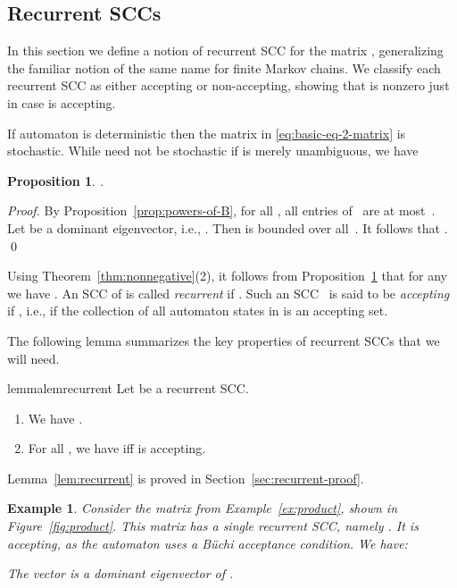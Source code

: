 \documentclass{elsarticle}
\newtheorem{proposition}[definition]{Proposition}
\newtheorem{example}[definition]{Example}
\begin{document}
\subsection{Recurrent SCCs}
\label{sub:recurrent}
In this section we define a notion of recurrent SCC for the matrix
, generalizing the familiar notion of the same name for finite
Markov chains.  We classify each recurrent SCC  as either accepting
or non-accepting, showing that  is nonzero just in case
 is accepting.

If automaton  is deterministic then the matrix  in
\eqref{eq:basic-eq-2-matrix} is stochastic.  While  need not be
stochastic if  is merely unambiguous, we have
\begin{proposition} \label{prop:spectral-radius-le-1}
  .
\end{proposition}
\begin{proof}
By Proposition~\ref{prop:powers-of-B}, for all , all entries of~ are at most~.
Let  be a dominant eigenvector, i.e., .
Then  is bounded over all~.
It follows that .
\qed
\end{proof}

Using Theorem~\ref{thm:nonnegative}(2), it follows from
Proposition~\ref{prop:spectral-radius-le-1} that for any
 we have .  An SCC
 of  is called \emph{recurrent} if
.  Such an SCC~ is said to be \emph{accepting} if
, i.e., if the collection
of all automaton states in  is an accepting set.

The following lemma summarizes the key properties of recurrent SCCs
that we will need.
\begin{restatable}{lemma}{lemrecurrent}\label{lem:recurrent}\label{LEM:RECURRENT}
  Let  be a recurrent SCC.
\begin{enumerate}
\item We have .
\item For all , we have  iff  is accepting.
\end{enumerate}
\end{restatable}
\noindent Lemma~\ref{lem:recurrent} is proved in Section~\ref{sec:recurrent-proof}.

\begin{example}
Consider the matrix  from Example~\ref{ex:product}, shown in
Figure~\ref{fig:product}.  This matrix has a single recurrent SCC,
namely .
It is accepting, as the automaton uses a B\"uchi acceptance condition.
We have:

The vector  is a dominant eigenvector of .
\end{example}
\end{document}
